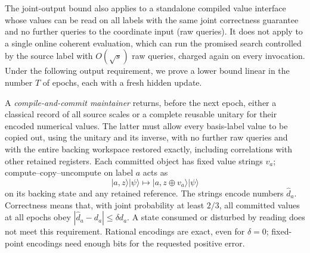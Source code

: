 The joint-output bound also applies to a standalone compiled value
interface whose values can be read on all labels with the same joint
correctness guarantee and no further queries to the coordinate input
(raw queries).  It does not apply to a single online
coherent evaluation, which can run the promised search controlled by the
source label with $O(\sqrt s)$ raw queries, charged again on every
invocation.  Under the following output requirement, we prove a lower
bound linear in the number $T$ of epochs, each with a fresh hidden update.

A \emph{compile-and-commit maintainer} returns, before the next epoch,
either a classical record of all source scales or a complete reusable
unitary for their encoded numerical values.  The latter must allow every
basis-label value to be copied out, using the unitary and its inverse,
with no further raw queries and with the entire backing workspace
restored exactly, including correlations with other retained registers.
Each committed object has fixed value strings $v_a$;
compute--copy--uncompute on label $a$ acts as
\[
 |a,z\rangle|\psi\rangle\longmapsto
 |a,z\mathbin\oplus v_a\rangle|\psi\rangle
\]
on its backing state and any retained reference.  The strings encode
numbers $\widehat d_a$.  Correctness means that, with joint probability at
least $2/3$, all committed values at all epochs obey
$|\widehat d_a-d_a|\leq\delta d_a$.  A state consumed or disturbed by
reading does not meet this requirement.  Rational encodings are exact,
even for $\delta=0$; fixed-point
encodings need enough bits for the requested positive error.

